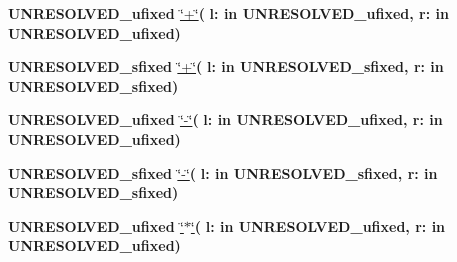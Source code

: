\begin{DoxyCompactItemize}
\item 
{\bfseries {\bfseries \textcolor{vhdlchar}{U\+N\+R\+E\+S\+O\+L\+V\+E\+D\+\_\+ufixed}\textcolor{vhdlchar}{ }}} \hyperlink{class__fixed__pkg_a758fadb06ceaaaffa80aa4473dc8dcda}{\char`\"{}+\char`\"{}}{\bfseries  ( }{\bfseries \textcolor{vhdlchar}{l\+: }\textcolor{stringliteral}{in }\textcolor{vhdlchar}{U\+N\+R\+E\+S\+O\+L\+V\+E\+D\+\_\+ufixed}}{\bfseries  , \textcolor{vhdlchar}{r\+: }\textcolor{stringliteral}{in }\textcolor{vhdlchar}{U\+N\+R\+E\+S\+O\+L\+V\+E\+D\+\_\+ufixed}}{\bfseries  )} 
\item 
{\bfseries {\bfseries \textcolor{vhdlchar}{U\+N\+R\+E\+S\+O\+L\+V\+E\+D\+\_\+sfixed}\textcolor{vhdlchar}{ }}} \hyperlink{class__fixed__pkg_a75f813bcb278832108d6fa67eccdfc1c}{\char`\"{}+\char`\"{}}{\bfseries  ( }{\bfseries \textcolor{vhdlchar}{l\+: }\textcolor{stringliteral}{in }\textcolor{vhdlchar}{U\+N\+R\+E\+S\+O\+L\+V\+E\+D\+\_\+sfixed}}{\bfseries  , \textcolor{vhdlchar}{r\+: }\textcolor{stringliteral}{in }\textcolor{vhdlchar}{U\+N\+R\+E\+S\+O\+L\+V\+E\+D\+\_\+sfixed}}{\bfseries  )} 
\item 
{\bfseries {\bfseries \textcolor{vhdlchar}{U\+N\+R\+E\+S\+O\+L\+V\+E\+D\+\_\+ufixed}\textcolor{vhdlchar}{ }}} \hyperlink{class__fixed__pkg_aa5b0e6d3b75f03dea7c3a4daedc04027}{\char`\"{}-\/\char`\"{}}{\bfseries  ( }{\bfseries \textcolor{vhdlchar}{l\+: }\textcolor{stringliteral}{in }\textcolor{vhdlchar}{U\+N\+R\+E\+S\+O\+L\+V\+E\+D\+\_\+ufixed}}{\bfseries  , \textcolor{vhdlchar}{r\+: }\textcolor{stringliteral}{in }\textcolor{vhdlchar}{U\+N\+R\+E\+S\+O\+L\+V\+E\+D\+\_\+ufixed}}{\bfseries  )} 
\item 
{\bfseries {\bfseries \textcolor{vhdlchar}{U\+N\+R\+E\+S\+O\+L\+V\+E\+D\+\_\+sfixed}\textcolor{vhdlchar}{ }}} \hyperlink{class__fixed__pkg_aa50f5cd3a12ba1cca2c9579edce09042}{\char`\"{}-\/\char`\"{}}{\bfseries  ( }{\bfseries \textcolor{vhdlchar}{l\+: }\textcolor{stringliteral}{in }\textcolor{vhdlchar}{U\+N\+R\+E\+S\+O\+L\+V\+E\+D\+\_\+sfixed}}{\bfseries  , \textcolor{vhdlchar}{r\+: }\textcolor{stringliteral}{in }\textcolor{vhdlchar}{U\+N\+R\+E\+S\+O\+L\+V\+E\+D\+\_\+sfixed}}{\bfseries  )} 
\item 
{\bfseries {\bfseries \textcolor{vhdlchar}{U\+N\+R\+E\+S\+O\+L\+V\+E\+D\+\_\+ufixed}\textcolor{vhdlchar}{ }}} \hyperlink{class__fixed__pkg_a29826fcafea88257a94a5fcc9ededcba}{\char`\"{}$\ast$\char`\"{}}{\bfseries  ( }{\bfseries \textcolor{vhdlchar}{l\+: }\textcolor{stringliteral}{in }\textcolor{vhdlchar}{U\+N\+R\+E\+S\+O\+L\+V\+E\+D\+\_\+ufixed}}{\bfseries  , \textcolor{vhdlchar}{r\+: }\textcolor{stringliteral}{in }\textcolor{vhdlchar}{U\+N\+R\+E\+S\+O\+L\+V\+E\+D\+\_\+ufixed}}{\bfseries  )} 

\end{DoxyCompactItemize}
